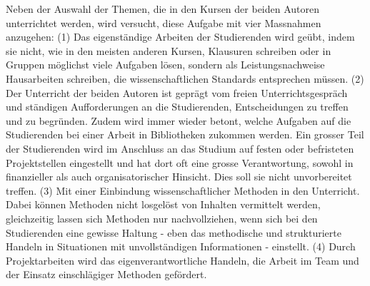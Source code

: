 \documentclass[a4paper,
fontsize=11pt,
oneside,
numbers=noperiodatend,
parskip=half-,
bibliography=totoc,
final
]{scrartcl}
\begin{document}
Neben der Auswahl der Themen, die in den Kursen der beiden Autoren
unterrichtet werden, wird versucht, diese Aufgabe mit vier Massnahmen
anzugehen: (1) Das eigenständige Arbeiten der Studierenden wird geübt,
indem sie nicht, wie in den meisten anderen Kursen, Klausuren schreiben
oder in Gruppen möglichst viele Aufgaben lösen, sondern als
Leistungsnachweise Hausarbeiten schreiben, die wissenschaftlichen
Standards entsprechen müssen. (2) Der Unterricht der beiden Autoren ist
geprägt vom freien Unterrichtsgespräch und ständigen Aufforderungen an
die Studierenden, Entscheidungen zu treffen und zu begründen. Zudem wird
immer wieder betont, welche Aufgaben auf die Studierenden bei einer
Arbeit in Bibliotheken zukommen werden. Ein grosser Teil der
Studierenden wird im Anschluss an das Studium auf festen oder
befristeten Projektstellen eingestellt und hat dort oft eine grosse
Verantwortung, sowohl in finanzieller als auch organisatorischer
Hinsicht. Dies soll sie nicht unvorbereitet treffen. (3) Mit einer
Einbindung wissenschaftlicher Methoden in den Unterricht. Dabei können
Methoden nicht losgelöst von Inhalten vermittelt werden, gleichzeitig
lassen sich Methoden nur nachvollziehen, wenn sich bei den Studierenden
eine gewisse Haltung - eben das methodische und strukturierte Handeln in
Situationen mit unvollständigen Informationen - einstellt. (4) Durch
Projektarbeiten wird das eigenverantwortliche Handeln, die Arbeit im
Team und der Einsatz einschlägiger Methoden gefördert.
\end{document}
